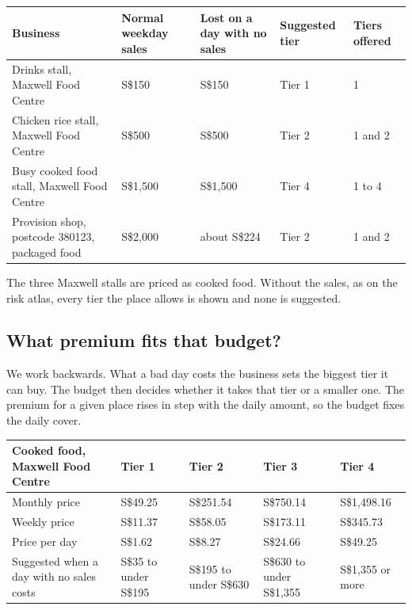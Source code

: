 \documentclass[11pt,a4paper]{article}
\newcommand{\head}{\rowcolor{soft}}
\newcommand{\sgd}{\textup{S\$}}
\begin{document}
\begin{center}
\small
\begin{tabularx}{\textwidth}{|Y|R{2.2cm}|R{2.4cm}|C{1.9cm}|C{2.2cm}|}
\hline
\head \textbf{Business} & \textbf{Normal weekday sales} & \textbf{Lost on a day with no sales} & \textbf{Suggested tier} & \textbf{Tiers offered} \\
\hline
Drinks stall, Maxwell Food Centre & \sgd 150 & \sgd 150 & Tier 1 & 1 \\
\hline
Chicken rice stall, Maxwell Food Centre & \sgd 500 & \sgd 500 & Tier 2 & 1 and 2 \\
\hline
Busy cooked food stall, Maxwell Food Centre & \sgd 1,500 & \sgd 1,500 & Tier 4 & 1 to 4 \\
\hline
Provision shop, postcode 380123, packaged food & \sgd 2,000 & about \sgd 224 & Tier 2 & 1 and 2 \\
\hline
\end{tabularx}
\end{center}

The three Maxwell stalls are priced as cooked food. Without the sales, as on the risk atlas, every tier the place allows is shown and none is suggested.

\subsection{What premium fits that budget?}\label{sec:budget}

We work backwards. What a bad day costs the business sets the biggest tier it can buy. The budget then decides whether it takes that tier or a smaller one. The premium for a given place rises in step with the daily amount, so the budget fixes the daily cover.

\begin{center}
\small
\begin{tabularx}{\textwidth}{|L{4.8cm}|Z|Z|Z|Z|}
\hline
\head \textbf{Cooked food, Maxwell Food Centre} & \textbf{Tier 1} & \textbf{Tier 2} & \textbf{Tier 3} & \textbf{Tier 4} \\
\hline
Monthly price & \sgd 49.25 & \sgd 251.54 & \sgd 750.14 & \sgd 1,498.16 \\
\hline
Weekly price & \sgd 11.37 & \sgd 58.05 & \sgd 173.11 & \sgd 345.73 \\
\hline
Price per day & \sgd 1.62 & \sgd 8.27 & \sgd 24.66 & \sgd 49.25 \\
\hline
Suggested when a day with no sales costs & \sgd 35 to under \sgd 195 & \sgd 195 to under \sgd 630 & \sgd 630 to under \sgd 1,355 & \sgd 1,355 or more \\
\hline
\end{tabularx}
\end{center}
\end{document}
